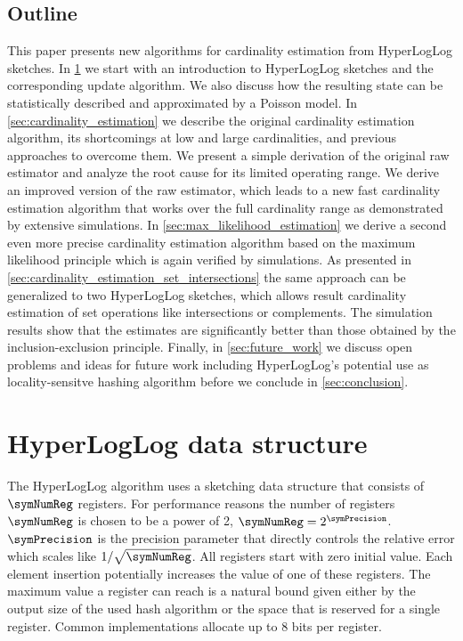 \documentclass[a4paper]{scrartcl}
\begin{document}
\subsection{Outline}
This paper presents new algorithms for cardinality estimation from HyperLogLog sketches. In \cref{sec:hyperloglog_data_structure} we start with an introduction to HyperLogLog sketches and the corresponding update algorithm. We also discuss how the resulting state can be statistically described and approximated by a Poisson model.
In \cref{sec:cardinality_estimation} we describe the original cardinality estimation algorithm, its shortcomings at low and large cardinalities, and previous approaches to overcome them. We present a simple derivation of the original raw estimator and analyze the root cause for its limited operating range. We derive an improved version of the raw estimator, which leads to a new fast cardinality estimation algorithm that works over the full cardinality range as demonstrated by extensive simulations.
In \cref{sec:max_likelihood_estimation} we derive a second even more precise cardinality estimation algorithm based on the maximum likelihood principle which is again verified by simulations. As presented in \cref{sec:cardinality_estimation_set_intersections} the same approach can be generalized to two HyperLogLog sketches, which allows result cardinality estimation of set operations like intersections or complements. The simulation results show that the estimates are significantly better than those obtained by the inclusion-exclusion principle.
Finally, in \cref{sec:future_work} we discuss open problems and ideas for future work including HyperLogLog's potential use as locality-sensitve hashing algorithm before we conclude in \cref{sec:conclusion}.

\section{HyperLogLog data structure}
\label{sec:hyperloglog_data_structure}
The HyperLogLog algorithm uses a sketching data structure that consists of $\symNumReg$ registers. For performance reasons the number of registers $\symNumReg$ is chosen to be a power of 2, $\symNumReg = 2^\symPrecision$. $\symPrecision$ is the precision parameter that directly controls the relative error which scales like $1/\sqrt{\symNumReg}$. All registers start with zero initial value. Each element insertion potentially increases the value of one of these registers. The maximum value a register can reach is a natural bound given either by the output size of the used hash algorithm or the space that is reserved for a single register. Common implementations allocate up to 8 bits per register.
\end{document}
